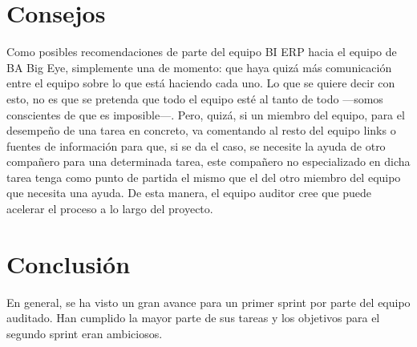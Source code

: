 \documentclass[12pt, a4paper]{article} %
\begin{document}
\section{Consejos}
Como posibles recomendaciones de parte del equipo BI ERP hacia el equipo de BA Big Eye, simplemente una de momento: que haya quizá más comunicación entre el equipo sobre lo que está haciendo cada uno. Lo que se quiere decir con esto, no es que se pretenda que todo el equipo esté al tanto de todo ---somos conscientes de que es imposible---. Pero, quizá, si un miembro del equipo, para el desempeño de una tarea en concreto, va comentando al resto del equipo links o fuentes de información para que, si se da el caso, se necesite la ayuda de otro compañero para una determinada tarea, este compañero no especializado en dicha tarea tenga como punto de partida el mismo que el del otro miembro del equipo que necesita una ayuda. De esta manera, el equipo auditor cree que puede acelerar el proceso a lo largo del proyecto.

\section{Conclusión}
En general, se ha visto un gran avance para un primer sprint por parte del equipo auditado. Han cumplido la mayor parte de sus tareas y los objetivos para el segundo sprint eran ambiciosos. 
\end{document}
